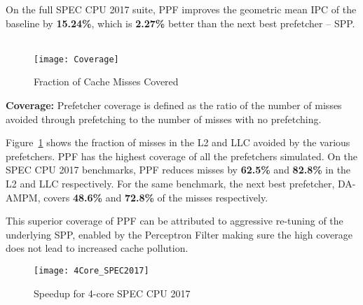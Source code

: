 On the full SPEC CPU 2017 suite, PPF improves the geometric mean IPC of 
the baseline by \textbf{15.24\%}, which is \textbf{2.27\%} better 
than the next best prefetcher -- SPP.\\ \\
%
\begin{figure}[h]
\texttt{[image: Coverage]}
\caption{Fraction of Cache Misses Covered}
\label{Fig:Coverage}
\end{figure}
%
\noindent \textbf{Coverage:}
Prefetcher coverage is defined as the ratio of the number of misses avoided
through prefetching to the number of misses with no prefetching.

Figure~\ref{Fig:Coverage} shows the fraction of misses in the L2 and LLC
avoided by the various prefetchers. PPF has the highest coverage of all the
prefetchers simulated. On the SPEC CPU 2017 benchmarks, PPF reduces misses by
\textbf{62.5\%} and \textbf{82.8\%} in the L2 and LLC respectively. For the
same benchmark, the next best prefetcher, DA-AMPM, covers \textbf{48.6\%} and
\textbf{72.8\%} of the misses respectively.

This superior coverage of PPF can be attributed to aggressive re-tuning of the
underlying SPP, enabled by the Perceptron Filter making sure the high coverage
does not lead to increased cache pollution.


\begin{figure}[ht]
\texttt{[image: 4Core\_SPEC2017]}
\caption{Speedup for 4-core SPEC CPU 2017}
\label{Fig:4Core_SPEC2017}
\end{figure}

